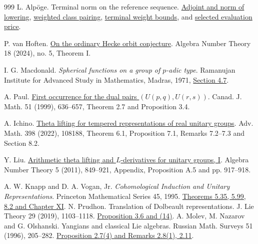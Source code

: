 \documentclass[11pt]{article}
\theoremstyle{definition}
\theoremstyle{plain}
\begin{document}
\begin{thebibliography}{999}
 L. Alp\"oge. Terminal norm on the reference sequence.
\href{https://github.com/TomasOrtega/RH/blob/a6ac91a412dcbaab31801355ec5707024a71bf65/extracted/lean/src/Development/AbelianVarietyTheory/Proofs/DivisorProofs/LastMapNorm.lean\#L319}{Adjoint and norm of lowering},
\href{https://github.com/TomasOrtega/RH/blob/a6ac91a412dcbaab31801355ec5707024a71bf65/extracted/lean/src/Development/AbelianVarietyTheory/Proofs/DivisorProofs/PeriodBoundLastLog.lean\#L52}{weighted class pairing},
\href{https://github.com/TomasOrtega/RH/blob/a6ac91a412dcbaab31801355ec5707024a71bf65/extracted/lean/src/Development/AbelianVarietyTheory/Proofs/DivisorProofs/LastSideLogBound.lean\#L124}{terminal weight bounds}, and
\href{https://github.com/TomasOrtega/RH/blob/a6ac91a412dcbaab31801355ec5707024a71bf65/extracted/lean/src/Development/AbelianVarietyTheory/Proofs/DivisorProofs/LastMapHalfRecNumsOfLogLevelPrimeLe.lean\#L14}{selected evaluation price}.

 P. van Hoften.
\href{https://arxiv.org/abs/2112.12422}{On the ordinary Hecke orbit
conjecture}. Algebra Number Theory 18 (2024), no. 5, Theorem I.

 I. G. Macdonald.
\emph{Spherical functions on a group of \(p\)-adic type}.
Ramanujan Institute for Advanced Study in Mathematics, Madras, 1971,
\href{https://math.soimeme.org/~arunram/Resources/SFOAGOPTContents.html}{Section 4.7}.

 A. Paul.
\href{https://doi.org/10.4153/CJM-1999-029-6}{First occurrence for the dual pairs
\( (U(p,q),U(r,s)) \)}. Canad. J. Math. 51 (1999), 636--657,
Theorem 2.7 and Proposition 3.4.

 A. Ichino.
\href{https://arxiv.org/abs/2008.06174}{Theta lifting for tempered
representations of real unitary groups}. Adv. Math. 398 (2022), 108188,
Theorem 6.1, Proposition 7.1, Remarks 7.2--7.3 and Section 8.2.

 Y. Liu.
\href{https://msp.org/ant/2011/5-7/ant-v5-n7-p01-p.pdf}{Arithmetic theta
lifting and \(L\)-derivatives for unitary groups, I}. Algebra Number Theory
5 (2011), 849--921, Appendix, Proposition A.5 and pp. 917--918.

 A. W. Knapp and D. A. Vogan, Jr.
\emph{Cohomological Induction and Unitary Representations}.
Princeton Mathematical Series 45, 1995.
\href{https://www.math.stonybrook.edu/~aknapp/books/kv.html}{Theorems 5.35, 5.99, 8.2 and Chapter XI}.
 N. Prudhon. Translation of Dolbeault representations.
J. Lie Theory 29 (2019), 1103--1118.
\href{https://arxiv.org/abs/1501.00502}{Proposition 3.6 and (14)}.
 A. Molev, M. Nazarov and G. Olshanski.
Yangians and classical Lie algebras. Russian Math. Surveys 51 (1996), 205--282.
\href{https://arxiv.org/abs/hep-th/9409025}{Proposition 2.7(4) and Remarks 2.8(1), 2.11}.


\end{thebibliography}
\end{document}
